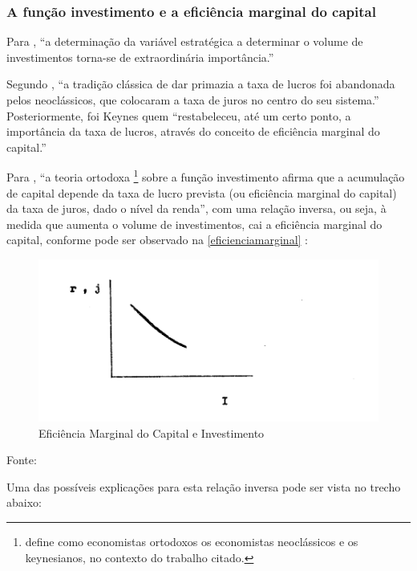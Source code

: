 \documentclass[]{article}
\let\rmarkdownfootnote\footnote%
\def\footnote{\protect\rmarkdownfootnote}
\begin{document}
\subsubsection{A função investimento e a eficiência marginal do
capital}\label{a-funcao-investimento-e-a-eficiencia-marginal-do-capital}

Para , ``a determinação da
variável estratégica a determinar o volume de investimentos torna-se de
extraordinária importância.''

Segundo , ``a tradição clássica de
dar primazia a taxa de lucros foi abandonada pelos neoclássicos, que
colocaram a taxa de juros no centro do seu sistema.'' Posteriormente,
foi Keynes quem ``restabeleceu, até um certo ponto, a importância da
taxa de lucros, através do conceito de eficiência marginal do capital.''

Para , ``a teoria ortodoxa
\footnote{ define como economistas ortodoxos os economistas neoclássicos e os keynesianos, no contexto do trabalho citado.}
sobre a função investimento afirma que a acumulação de capital depende
da taxa de lucro prevista (ou eficiência marginal do capital) da taxa de
juros, dado o nível da renda'', com uma relação inversa, ou seja, à
medida que aumenta o volume de investimentos, cai a eficiência marginal
do capital, conforme pode ser observado na \autoref{eficienciamarginal}
\cite[p.~4]{Bresser-Pereira1973}:

\begin{figure}
\centering
\includegraphics{imagens/Page-4-Image-1.png}
\caption{Eficiência Marginal do Capital e
Investimento}\label{eficienciamarginal}
\end{figure}

Fonte: \cite{Bresser-Pereira1973}

Uma das possíveis explicações para esta relação inversa pode ser vista
no trecho abaixo:
\end{document}
